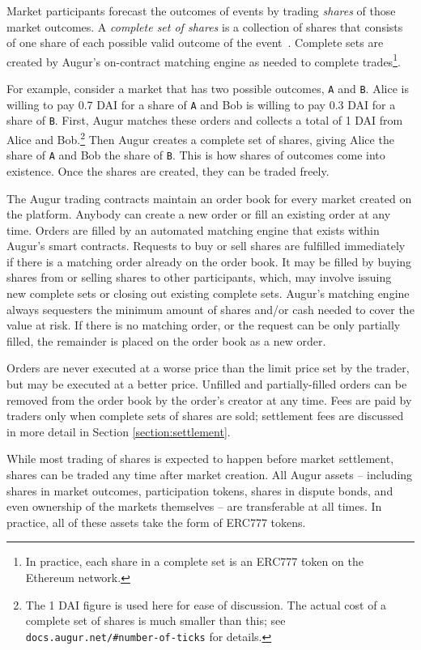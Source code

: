 \documentclass[floatfix,reprint,nofootinbib,amsmath,amssymb,epsfig,pre,floats,letterpaper,groupedaffiliation]{revtex4-1}
\theoremstyle{definition}
\theoremstyle{definition}
\begin{document}
Market participants forecast the outcomes of events by trading \textit{shares} of those market outcomes.  A \textit{complete set of shares} is a collection of shares that consists of one share of each possible valid outcome of the event~\cite{Clark_2014}.  Complete sets are created by Augur's on-contract matching engine as needed to complete trades\footnote{In practice, each share in a complete set is an ERC777 token on the Ethereum network.}.

For example, consider a market that has two possible outcomes, \texttt{A} and \texttt{B}.  Alice is willing to pay 0.7 DAI for a share of \texttt{A} and Bob is willing to pay 0.3 DAI for a share of \texttt{B}. First, Augur matches these orders and collects a total of 1 DAI from Alice and Bob.\footnote{The 1 DAI figure is used here for ease of discussion.  The actual cost of a complete set of shares is much smaller than this; see \texttt{docs.augur.net/\#number-of-ticks} for details.\label{footnote:complete_set_cost}}  Then Augur creates a complete set of shares, giving Alice the share of \texttt{A} and Bob the share of \texttt{B}.  This is how shares of outcomes come into existence.  Once the shares are created, they can be traded freely.

The Augur trading contracts maintain an order book for every market created on the platform.  Anybody can create a new order or fill an existing order at any time.  Orders are filled by an automated matching engine that exists within Augur's smart contracts.  Requests to buy or sell shares are fulfilled immediately if there is a matching order already on the order book.  It may be filled by buying shares from or selling shares to other participants, which, may involve issuing new complete sets or closing out existing complete sets.  Augur's matching engine always sequesters the minimum amount of shares and/or cash needed to cover the value at risk.  If there is no matching order, or the request can be only partially filled, the remainder is placed on the order book as a new order.

Orders are never executed at a worse price than the limit price set by the trader, but may be executed at a better price.  Unfilled and partially-filled orders can be removed from the order book by the order's creator at any time.  Fees are paid by traders only when complete sets of shares are sold; settlement fees are discussed in more detail in Section \ref{section:settlement}.

While most trading of shares is expected to happen before market settlement, shares can be traded any time after market creation.  All Augur assets -- including shares in market outcomes, participation tokens, shares in dispute bonds, and even ownership of the markets themselves -- are transferable at all times. In practice, all of these assets take the form of ERC777 tokens.
\end{document}
